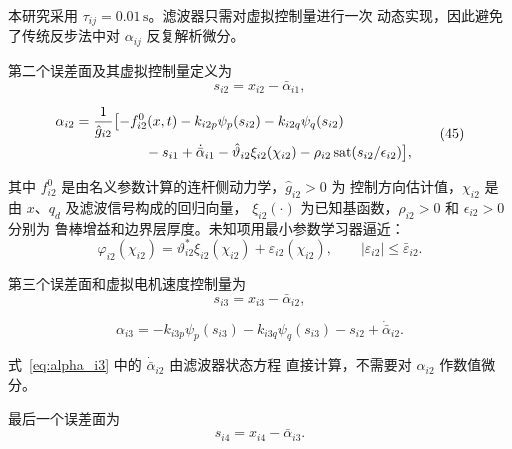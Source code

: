 \documentclass{article}
\begin{document}
本研究采用 $\tau_{ij}=0.01\,\mathrm{s}$。滤波器只需对虚拟控制量进行一次
动态实现，因此避免了传统反步法中对 $\alpha_{ij}$ 反复解析微分。

第二个误差面及其虚拟控制量定义为
\begin{equation}
 s_{i2}=x_{i2}-\bar\alpha_{i1},

 \tag{44}
\label{eq:s_i2}
\end{equation}

\begin{equation}
\begin{aligned}
 \alpha_{i2}={}&\frac{1}{\hat g_{i2}}
 \bigl[-f_{i2}^{0}(x,t)-k_{i2p}\psi_p(s_{i2})
 -k_{i2q}\psi_q(s_{i2})\\
 &\hspace{13mm}-s_{i1}+\dot{\bar\alpha}_{i1}
 -\hat\vartheta_{i2}\xi_{i2}(\chi_{i2})
 -\rho_{i2}\operatorname{sat}(s_{i2}/\epsilon_{i2})\bigr],
\end{aligned}

 \tag{45}
\label{eq:alpha_i2}
\end{equation}

其中 $f_{i2}^{0}$ 是由名义参数计算的连杆侧动力学，$\hat g_{i2}>0$ 为
控制方向估计值，$\chi_{i2}$ 是由 $x$、$q_d$ 及滤波信号构成的回归向量，
$\xi_{i2}(\cdot)$ 为已知基函数，$\rho_{i2}>0$ 和 $\epsilon_{i2}>0$ 分别为
鲁棒增益和边界层厚度。未知项用最小参数学习器逼近：
\begin{equation}
 \varphi_{i2}(\chi_{i2})
 =\vartheta_{i2}^{*}\xi_{i2}(\chi_{i2})+\varepsilon_{i2}(\chi_{i2}),
 \qquad |\varepsilon_{i2}|\leq\bar\varepsilon_{i2}.

 \tag{46}
\label{eq:mlp_i2}
\end{equation}


第三个误差面和虚拟电机速度控制量为
\begin{equation}
 s_{i3}=x_{i3}-\bar\alpha_{i2},

 \tag{47}
\label{eq:s_i3}
\end{equation}

\begin{equation}
 \alpha_{i3}=-k_{i3p}\psi_p(s_{i3})
 -k_{i3q}\psi_q(s_{i3})-s_{i2}
 +\dot{\bar\alpha}_{i2}.

 \tag{48}
\label{eq:alpha_i3}
\end{equation}

式~\eqref{eq:alpha_i3} 中的 $\dot{\bar\alpha}_{i2}$ 由滤波器状态方程
直接计算，不需要对 $\alpha_{i2}$ 作数值微分。

最后一个误差面为
\begin{equation}
 s_{i4}=x_{i4}-\bar\alpha_{i3} .

 \tag{49}
\label{eq:s_i4}
\end{equation}
\end{document}
